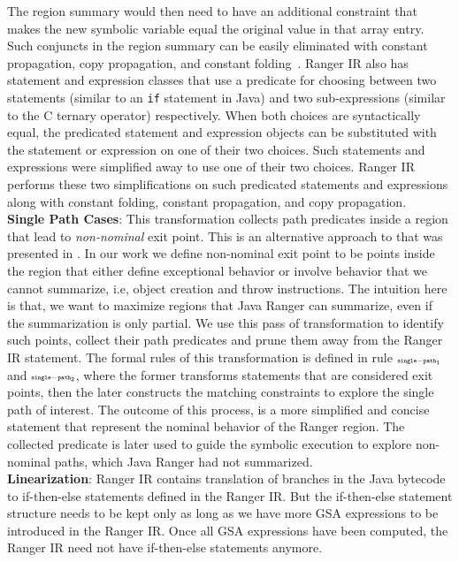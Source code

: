 %
The region summary would then need to have an additional constraint that makes the new symbolic variable equal the
original value in that array entry.
%
Such conjuncts in the region summary can be easily eliminated with constant propagation, copy propagation, and constant
folding~\cite{dragon-book}.
%
Ranger IR also has statement and expression classes that use a predicate for choosing between two statements (similar to
an {\tt if} statement in Java) and two sub-expressions (similar to the C ternary operator) respectively.
%
When both choices are syntactically equal, the predicated statement and expression objects can be substituted with the
statement or expression on one of their two choices.
%
Such statements and expressions were simplified away to use one of their two choices.
%
Ranger IR performs these two simplifications on such predicated statements and expressions along with constant folding,
constant propagation, and copy propagation.\\
\textbf{Single Path Cases}: This transformation collects path predicates inside a region that lead to
\textit{non-nominal} exit point.
%
This is an alternative approach to that was presented in \cite{veritesting}.
%
In our work we define non-nominal exit point to be points inside the region that either define exceptional behavior or
involve behavior that we cannot summarize, i.e, object creation and throw instructions.
%
The intuition here is that, we want to maximize regions that Java Ranger can summarize, even if the summarization is
only partial.
%
We use this pass of transformation to identify such points, collect their path predicates and prune them away from the
Ranger IR statement. The formal rules of this transformation is defined in rule $\scriptscriptstyle\mathtt{single-path_1}$ and $\scriptscriptstyle\mathtt{single-path_2}$, where the former transforms statements that are considered exit points, then the later constructs the matching constraints to explore the single path of interest. 
%
The outcome of this process, is a more simplified and concise statement that represent the nominal behavior of the Ranger region.
%
The collected predicate is later used to guide the symbolic execution to explore non-nominal paths, which Java Ranger
had not summarized.  \\
%
\textbf{Linearization}:
Ranger IR contains translation of branches in the Java bytecode to if-then-else statements defined in the Ranger IR.
%
But the if-then-else statement structure needs to be kept only as long as we have more GSA expressions to be
introduced in the Ranger IR.
%
Once all GSA expressions have been computed, the Ranger IR need not have if-then-else statements anymore.
